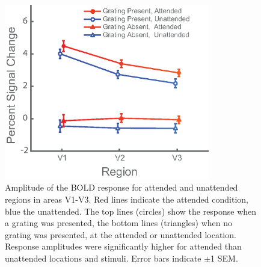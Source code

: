 \begin{figure}[!ht]
\centering
\includegraphics[width=0.8\textwidth, clip=true]{./Chapters/04_Attention/Images/RoiResults}
\caption{Amplitude of the BOLD response for attended and unattended regions in areas V1-V3. Red lines indicate the attended condition, blue the unattended. The top lines (circles) show the response when a grating was presented, the bottom lines (triangles) when no grating was presented, at the attended or unattended location. Response amplitudes were significantly higher for attended than unattended locations and stimuli. Error bars indicate $\pm$1 SEM.}
\label{fig:roiresults}
\end{figure}